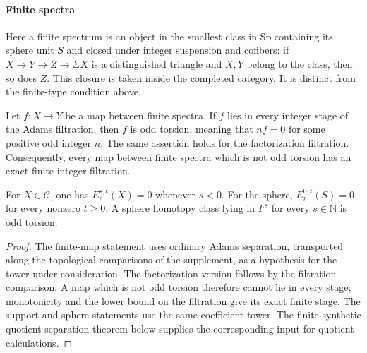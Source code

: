 \paragraph*{Finite spectra}
Here a finite spectrum is an object in the smallest class in
$\mathrm{Sp}$ containing its sphere unit $S$ and closed under integer
suspension and cofibers: if
$X\to Y\to Z\to\Sigma X$ is a distinguished triangle and $X,Y$
belong to the class, then so does $Z$. This closure is taken inside the
completed category. It is distinct from the finite-type condition above.

\begin{theorem}
\label{sem:AdamsSynthetic:finite-separation}
Let $f\colon X\to Y$ be a map between finite spectra. If $f$ lies in
every integer stage of the Adams filtration, then $f$ is odd torsion,
meaning that $nf=0$ for some positive odd integer $n$. The same assertion
holds for the factorization filtration. Consequently, every map between
finite spectra which is not odd torsion has an exact finite integer
filtration.

For $X\in\mathcal C$, one has $E_r^{s,t}(X)=0$ whenever $s<0$. For the sphere, $E_r^{0,t}(S)=0$ for every nonzero $t\geq0$. A sphere homotopy class lying in $F^s$ for every $s\in\mathbb N$ is odd torsion.
\end{theorem}
\begin{proof}
The finite-map statement uses ordinary Adams separation, transported
along the topological comparisons of the supplement, as a hypothesis
for the tower under consideration. The factorization version follows
by the filtration comparison.
A map which is not odd torsion therefore cannot lie in every stage;
monotonicity and the lower bound on the filtration give its exact finite
stage. The support and sphere statements use the same coefficient tower.
The finite synthetic quotient separation theorem below supplies
the corresponding input for quotient calculations.
\end{proof}

